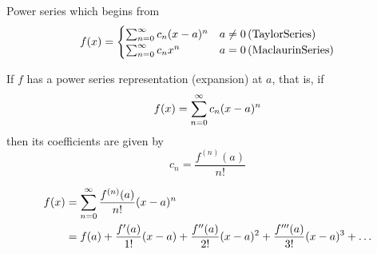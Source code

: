 \begin{definition}
  Power series which begins from 
  \[
    f(x) = \begin{cases}
      \sum_{n=0}^{\infty} c_n(x-a)^n & a \neq 0 \, \mathrm{(Taylor Series)}\\
      \sum_{n=0}^{\infty} c_nx^n & a = 0 \, \mathrm{(Maclaurin Series)}
    \end{cases}
  \]
\end{definition}

\begin{theorem}
  If \(f\) has a power series representation (expansion) at \(a\), that is, if
  \[
    f(x) = \sum_{n=0}^{\infty} c_{n}(x - a)^n
  \]
  then its coefficients are given by
  \[
    c_n = \frac{f^{(n)}(a)}{n!}
  \]
\end{theorem}


\begin{corollary}
  \begin{equation}
    \nonumber
    \begin{aligned}
      f(x) &= \sum_{n=0}^{\infty} \frac{f^{(n)}(a)}{n!}(x-a)^n \\
      &= f(a) + \frac{f'(a)}{1!}(x-a) + \frac{f''(a)}{2!}(x-a)^2 + \frac{f'''(a)}{3!}(x-a)^3 + \dots
    \end{aligned}
  \end{equation}
\end{corollary}


